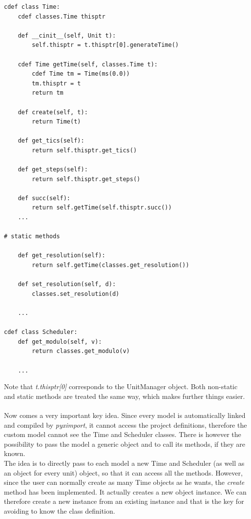 \documentclass{article}
\begin{document}
\begin{verbatim}
cdef class Time:
    cdef classes.Time thisptr

    def __cinit__(self, Unit t):
        self.thisptr = t.thisptr[0].generateTime()

    cdef Time getTime(self, classes.Time t):
        cdef Time tm = Time(ms(0.0))
        tm.thisptr = t
        return tm

    def create(self, t):
        return Time(t)

    def get_tics(self):
        return self.thisptr.get_tics()

    def get_steps(self):
        return self.thisptr.get_steps()

    def succ(self):
        return self.getTime(self.thisptr.succ()) 
    ...

# static methods

    def get_resolution(self):
        return self.getTime(classes.get_resolution())
        
    def set_resolution(self, d):
        classes.set_resolution(d)

    ...
        
cdef class Scheduler:
    def get_modulo(self, v):
        return classes.get_modulo(v)

    ...
\end{verbatim}
Note that \emph{t.thisptr[0]} corresponds to the UnitManager object. Both non-static and static methods are treated the same way, which makes further things easier. \\ \\

Now comes a very important key idea. Since every model is automatically linked and compiled by \emph{pyximport}, it cannot access the project definitions, therefore the custom model cannot see the Time and Scheduler classes. There is however the possibility to pass the model a generic object and to call its methods, if they are known. \\
The idea is to directly pass to each model a new Time and Scheduler (as well as an object for every unit) object, so that it can access all the methods. However, since the user can normally create as many Time objects as he wants, the \emph{create} method has been implemented. It actually creates a new object instance. We can therefore create a new instance from an existing instance and that is the key for avoiding to know the class definition. \\ \\
\end{document}
